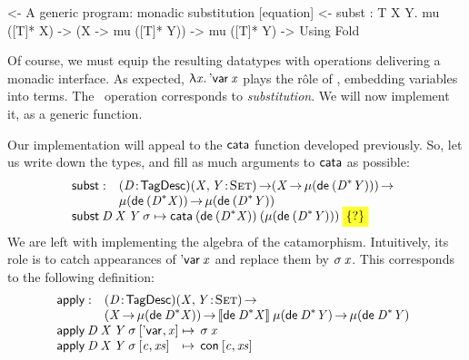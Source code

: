 \begin{wstructure}
<- A generic program: monadic substitution [equation]
    <- subst : \forall T X Y. mu ([T]* X) -> (X -> mu ([T]* Y)) -> mu ([T]* Y)
        -> Using Fold
\end{wstructure}

Of course, we must equip the resulting datatypes with operations
delivering a monadic interface. As expected, \(\LAM{\x}\DVar{\x}\)
plays the r\^ole of \return, embedding variables into terms. The
\bind\ operation corresponds to \emph{substitution}. We will now
implement it, as a generic function.


\newcommand{\subst}{\F{subst}}
\newcommand{\apply}{\F{apply}}

Our implementation will appeal to the $\cata$ function developed
previously. So, let us write down the types, and fill as much
arguments to $\cata$ as possible:
%
\[\stk{
\begin{array}{@{}ll}
\subst : & \PITEL{\V{D}}{\TagDesc}
           \PI{\V{X}, \V{Y}}{\Set} 
           (\V{X} \To \Mu{(\toDesc{(\FreeMonad{\V{D}}{\V{Y}})})}) \To \\
         & \Mu{(\toDesc{(\FreeMonad{\V{D}}{\V{X}})})} \To
           \Mu{(\toDesc{(\FreeMonad{\V{D}}{\V{Y}})})} 
\end{array} \\
\subst\: \V{D}\: \V{X}\: \V{Y}\: \V{\sigma} \mapsto
  \cata\: (\toDesc{(\FreeMonad{\V{D}}{\V{X}})})\: 
          (\Mu{(\toDesc{(\FreeMonad{\V{D}}{\V{Y}})})})\: 
          \SHED
}\]
%
We are left with implementing the algebra of the
catamorphism. Intuitively, its role is to catch appearances of
$\DVar{\V{x}}$ and replace them by $\V{\sigma}\: \V{x}$. This
corresponds to the following definition:
%
\[\stk{
\begin{array}{@{}ll}
\apply : & \PITEL{\V{D}}{\TagDesc} 
           \PI{\V{X}, \V{Y}}{\Set} \\
         & (\V{X} \To \Mu{(\toDesc{\FreeMonad{\V{D}}{\V{X}}})}) \To
           \descop{\toDesc{\FreeMonad{\V{D}}{\V{X}}}}{\Mu{(\toDesc{\FreeMonad{\V{D}}{\V{Y}}})}} \To
           \Mu{(\toDesc{\FreeMonad{\V{D}}{\V{Y}}})}
\\
\end{array} \\
\begin{array}{@{}l@{\:\mapsto\:\:}l}
\apply\: \V{D}\: \V{X}\: \V{Y}\: \V{\sigma}\: \pair{\DVar{\!}}{\V{x}}{}   & \V{\sigma}\: \V{x}                   \\
\apply\: \V{D}\: \V{X}\: \V{Y}\: \V{\sigma}\: \pair{\V{c}}{\V{xs}}{} & \Con{\pair{\V{c}}{\V{xs}}{}}
\end{array}
}\]


